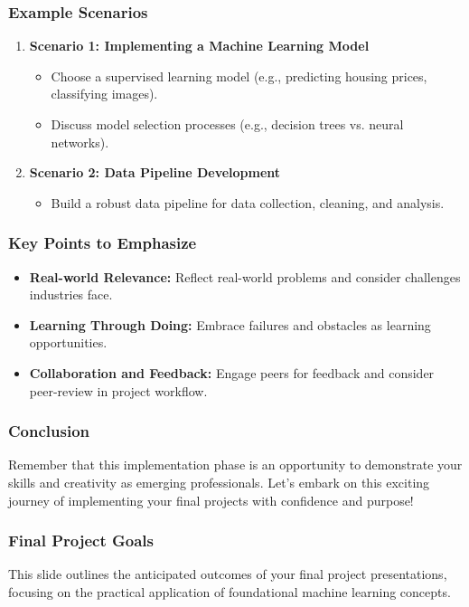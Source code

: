 \documentclass[aspectratio=169]{beamer}
\begin{document}
\begin{frame}[fragile]
    \frametitle{Example Scenarios}
    \begin{enumerate}
        \item \textbf{Scenario 1: Implementing a Machine Learning Model}
        \begin{itemize}
            \item Choose a supervised learning model (e.g., predicting housing prices, classifying images).
            \item Discuss model selection processes (e.g., decision trees vs. neural networks).
        \end{itemize}

        \item \textbf{Scenario 2: Data Pipeline Development}
        \begin{itemize}
            \item Build a robust data pipeline for data collection, cleaning, and analysis.
        \end{itemize}
    \end{enumerate}
\end{frame}

\begin{frame}[fragile]
    \frametitle{Key Points to Emphasize}
    \begin{itemize}
        \item \textbf{Real-world Relevance:} Reflect real-world problems and consider challenges industries face.
        \item \textbf{Learning Through Doing:} Embrace failures and obstacles as learning opportunities.
        \item \textbf{Collaboration and Feedback:} Engage peers for feedback and consider peer-review in project workflow.
    \end{itemize}
\end{frame}

\begin{frame}[fragile]
    \frametitle{Conclusion}
    \begin{block}{}
        Remember that this implementation phase is an opportunity to demonstrate your skills and creativity as emerging professionals. Let’s embark on this exciting journey of implementing your final projects with confidence and purpose!
    \end{block}
\end{frame}

\begin{frame}[fragile]
    \frametitle{Final Project Goals}
    This slide outlines the anticipated outcomes of your final project presentations, focusing on the practical application of foundational machine learning concepts.
\end{frame}
\end{document}
